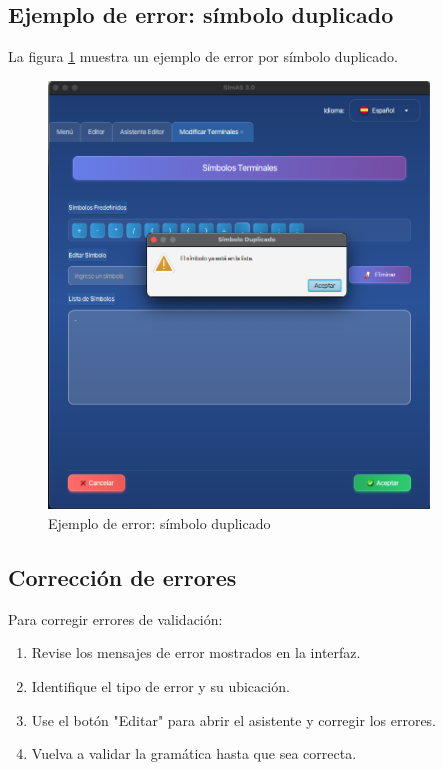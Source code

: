 \subsection{Ejemplo de error: símbolo duplicado}

La figura \ref{fig:simbolo_duplicado} muestra un ejemplo de error por símbolo duplicado.

\needspace{8cm}
\begin{figure}[H]
    \centering
    \includegraphics[width=0.9\textwidth]{figuras/editor/simbolo_duplicado.png}
    \caption{Ejemplo de error: símbolo duplicado}
    \label{fig:simbolo_duplicado}
\end{figure}

\subsection{Corrección de errores}

Para corregir errores de validación:

\begin{enumerate}
    \item Revise los mensajes de error mostrados en la interfaz.
    \item Identifique el tipo de error y su ubicación.
    \item Use el botón \string"Editar\string" para abrir el asistente y corregir los errores.
    \item Vuelva a validar la gramática hasta que sea correcta.
\end{enumerate}

